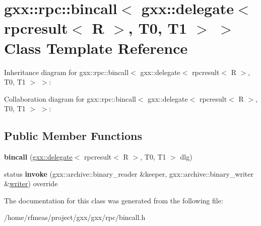 \hypertarget{classgxx_1_1rpc_1_1bincall_3_01gxx_1_1delegate_3_01rpcresult_3_01R_01_4_00_01T0_00_01T1_01_4_01_4}{}\section{gxx\+:\+:rpc\+:\+:bincall$<$ gxx\+:\+:delegate$<$ rpcresult$<$ R $>$, T0, T1 $>$ $>$ Class Template Reference}
\label{classgxx_1_1rpc_1_1bincall_3_01gxx_1_1delegate_3_01rpcresult_3_01R_01_4_00_01T0_00_01T1_01_4_01_4}


Inheritance diagram for gxx\+:\+:rpc\+:\+:bincall$<$ gxx\+:\+:delegate$<$ rpcresult$<$ R $>$, T0, T1 $>$ $>$\+:


Collaboration diagram for gxx\+:\+:rpc\+:\+:bincall$<$ gxx\+:\+:delegate$<$ rpcresult$<$ R $>$, T0, T1 $>$ $>$\+:
\subsection*{Public Member Functions}
\begin{DoxyCompactItemize}
\item 
{\bfseries bincall} (\hyperlink{classgxx_1_1delegate}{gxx\+::delegate}$<$ rpcresult$<$ R $>$, T0, T1 $>$ dlg)\hypertarget{classgxx_1_1rpc_1_1bincall_3_01gxx_1_1delegate_3_01rpcresult_3_01R_01_4_00_01T0_00_01T1_01_4_01_4_a9148af49bceb1ec1565bb9722c39ca14}{}\label{classgxx_1_1rpc_1_1bincall_3_01gxx_1_1delegate_3_01rpcresult_3_01R_01_4_00_01T0_00_01T1_01_4_01_4_a9148af49bceb1ec1565bb9722c39ca14}

\item 
status {\bfseries invoke} (gxx\+::archive\+::binary\+\_\+reader \&keeper, gxx\+::archive\+::binary\+\_\+writer \&\hyperlink{classgxx_1_1writer}{writer}) override\hypertarget{classgxx_1_1rpc_1_1bincall_3_01gxx_1_1delegate_3_01rpcresult_3_01R_01_4_00_01T0_00_01T1_01_4_01_4_a95b132821e3294caae527afd59487166}{}\label{classgxx_1_1rpc_1_1bincall_3_01gxx_1_1delegate_3_01rpcresult_3_01R_01_4_00_01T0_00_01T1_01_4_01_4_a95b132821e3294caae527afd59487166}

\end{DoxyCompactItemize}


The documentation for this class was generated from the following file\+:\begin{DoxyCompactItemize}
\item 
/home/rfmeas/project/gxx/gxx/rpc/bincall.\+h\end{DoxyCompactItemize}
